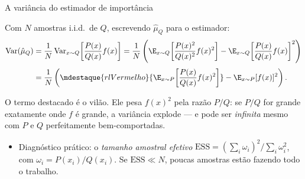 \documentclass[aspectratio=169, 10pt]{beamer}
\newcommand{\Var}{\operatorname{Var}}
\begin{document}
\begin{frame}{A variância do estimador de importância}

  Com $N$ amostras i.i.d.\ de $Q$, escrevendo $\hat\mu_Q$ para o estimador:
  \begin{align*}
    \Var(\hat\mu_Q)
      &= \frac{1}{N}\Var_{x\sim Q}\!\left[\frac{P(x)}{Q(x)}f(x)\right]
       = \frac{1}{N}\left(
          \E_{x\sim Q}\!\left[\frac{P(x)^2}{Q(x)^2}f(x)^2\right]
          - \E_{x\sim Q}\!\left[\frac{P(x)}{Q(x)}f(x)\right]^{2}\right)\\[0.3em]
      &= \frac{1}{N}\left(
          \mdestaque{rlVermelho}{\E_{x\sim P}\!\left[\frac{P(x)}{Q(x)}f(x)^2\right]}
          - \E_{x\sim P}[f(x)]^{2}\right).
  \end{align*}

  \begin{alertabox}
    O termo destacado é o vilão. Ele pesa $f(x)^2$ pela razão $P/Q$: se $P/Q$ for
    grande exatamente onde $f$ é grande, a variância explode --- e pode ser
    \emph{infinita} mesmo com $P$ e $Q$ perfeitamente bem-comportadas.
  \end{alertabox}

  \begin{itemize}
    \item Diagnóstico prático: o \emph{tamanho amostral efetivo}
      $\mathrm{ESS} = (\sum_i \omega_i)^2 / \sum_i \omega_i^2$, com $\omega_i = P(x_i)/Q(x_i)$.
      Se $\mathrm{ESS} \ll N$, poucas amostras estão fazendo todo o trabalho.
  \end{itemize}
\end{frame}
\end{document}
